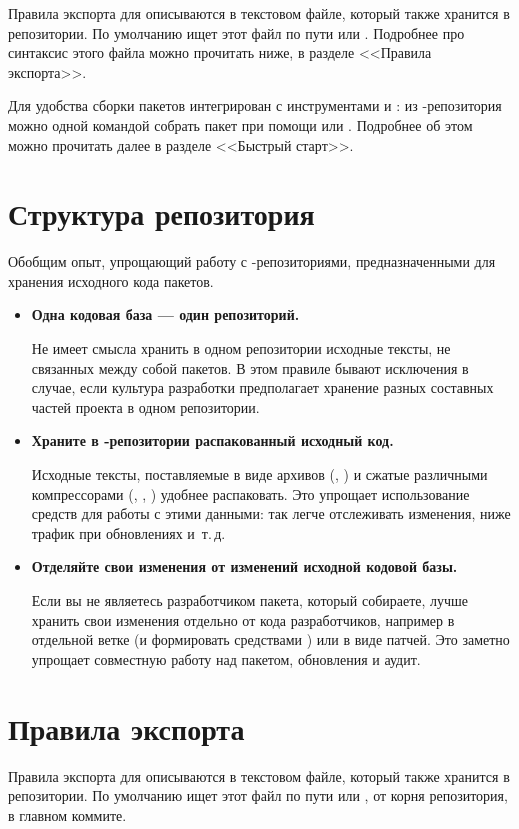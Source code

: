 Правила экспорта для  описываются в текстовом файле, который также хранится в 
репозитории. По умолчанию  ищет этот файл по пути  или . 
Подробнее про синтаксис этого файла можно прочитать ниже, в разделе <<Правила экспорта>>.

Для удобства сборки пакетов  интегрирован с инструментами  и 
: из -репозитория можно одной командой собрать пакет при помощи 
 или . Подробнее об этом можно прочитать далее в разделе <<Быстрый старт>>. 


\section{Структура репозитория}
Обобщим опыт, упрощающий работу с -репозиториями, предназначенными для хранения исходного кода пакетов. 

\begin{itemize}
	\item \textbf{Одна кодовая база --- один репозиторий.}
	
	Не имеет смысла хранить в одном репозитории исходные тексты, не связанных между собой пакетов. В этом правиле бывают исключения в случае, если культура разработки предполагает хранение разных составных частей проекта в одном репозитории.
	
	\item  \textbf{Храните в -репозитории распакованный исходный код.}
	
	Исходные тексты, поставляемые в виде архивов (, ) и сжатые различными компрессорами (, , ) удобнее распаковать. Это упрощает использование средств  для работы с этими данными: так легче отслеживать изменения, ниже трафик при обновлениях и~т.\,д.
	
	\item \textbf{Отделяйте свои изменения от изменений исходной кодовой базы.}
	
	Если вы не являетесь разработчиком пакета, который собираете, лучше хранить свои изменения отдельно от кода разработчиков, например в отдельной ветке (и формировать  средствами ) или в виде патчей. Это заметно упрощает совместную работу над пакетом, обновления и аудит.
\end{itemize}


\section{Правила экспорта}
Правила экспорта для  описываются в текстовом файле, который также хранится в репозитории. По умолчанию  ищет этот файл по пути  или , от корня репозитория, в главном коммите. 


